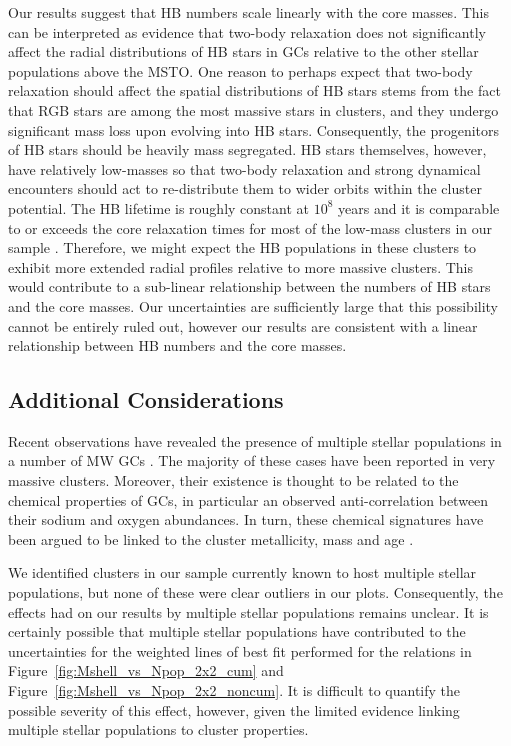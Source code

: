 Our results suggest that HB numbers scale linearly with the core
masses.  This can be interpreted as evidence that two-body relaxation
does not significantly affect the radial distributions of HB 
stars in GCs relative to the other stellar populations above the
MSTO.  One reason to perhaps expect that two-body relaxation should
affect the spatial distributions of HB stars stems from the fact 
that RGB stars are among the most massive stars in clusters, and they
undergo significant mass loss upon evolving into HB stars.
Consequently, the progenitors of HB stars should be heavily mass
segregated.  HB stars themselves, however, have relatively low-masses
so that two-body relaxation and 
strong dynamical encounters should act to re-distribute them to wider
orbits within the cluster potential.  The HB 
lifetime is roughly constant at $10^8$ years \citep{iben91} and it is
comparable to or exceeds the core relaxation times for most of the
low-mass clusters in our sample \citep{harris96}.  Therefore, we might
expect the HB populations in these 
clusters to exhibit more extended radial profiles relative to 
more massive clusters.  This
would contribute to a sub-linear relationship between the numbers of
HB stars and the core masses.  Our uncertainties are sufficiently
large that this possibility cannot be entirely ruled out, however our
results are consistent with a linear relationship between HB numbers
and the core masses.  

\subsection{Additional Considerations} \label{final4}

Recent observations have revealed the presence of
multiple stellar populations in a number of MW GCs
\citep[e.g.][]{pancino03}.  The majority of these cases have
been reported in very massive clusters.  Moreover, their existence is
thought to be related to the chemical properties of GCs, in
particular an observed anti-correlation between their sodium and oxygen 
abundances.  In turn, these chemical signatures have been argued to be
linked to the cluster metallicity, mass and age \citep{carretta10}.  

We identified clusters in our sample currently known to host multiple stellar
populations, but none of these were clear outliers in
our plots.  Consequently, the effects had on our results by multiple stellar
populations remains unclear.  It is certainly possible that multiple
stellar populations have contributed to the uncertainties for
the weighted lines of best fit performed for the relations in 
Figure~\ref{fig:Mshell_vs_Npop_2x2_cum} and
Figure~\ref{fig:Mshell_vs_Npop_2x2_noncum}.  It is difficult to
quantify the possible severity of this effect, however, given the
limited evidence linking multiple stellar populations to cluster
properties.  

